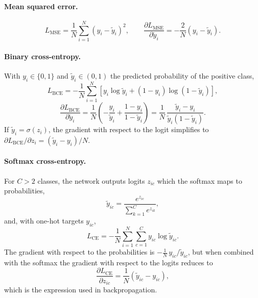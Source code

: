 \documentclass[amssymb,twocolumn,aps]{revtex4}
\begin{document}
\paragraph{Mean squared error.}
\begin{equation}
L_{\mathrm{MSE}} = \frac{1}{N}\sum_{i=1}^{N}\left(y_i-\tilde{y}_i\right)^2,
\qquad
\frac{\partial L_{\mathrm{MSE}}}{\partial \tilde{y}_i} = -\frac{2}{N}\left(y_i-\tilde{y}_i\right).
\end{equation}

\paragraph{Binary cross-entropy.}
With $y_i\in\{0,1\}$ and $\tilde{y}_i\in(0,1)$ the predicted probability of the positive class,
\begin{equation}
L_{\mathrm{BCE}} = -\frac{1}{N}\sum_{i=1}^{N}\left[y_i\log\tilde{y}_i+(1-y_i)\log(1-\tilde{y}_i)\right],
\end{equation}
\begin{equation}
\frac{\partial L_{\mathrm{BCE}}}{\partial \tilde{y}_i}
= \frac{1}{N}\left(-\frac{y_i}{\tilde{y}_i}+\frac{1-y_i}{1-\tilde{y}_i}\right)
= \frac{1}{N}\,\frac{\tilde{y}_i-y_i}{\tilde{y}_i(1-\tilde{y}_i)}.
\end{equation}
If $\tilde{y}_i=\sigma(z_i)$, the gradient with respect to the logit simplifies to $\partial L_{\mathrm{BCE}}/\partial z_i=(\tilde{y}_i-y_i)/N$.

\paragraph{Softmax cross-entropy.}
For $C>2$ classes, the network outputs logits $z_{ic}$ which the softmax maps to probabilities,
\begin{equation}
\tilde{y}_{ic}=\frac{e^{z_{ic}}}{\sum_{k=1}^{C}e^{z_{ik}}},
\end{equation}
and, with one-hot targets $y_{ic}$,
\begin{equation}
L_{\mathrm{CE}} = -\frac{1}{N}\sum_{i=1}^{N}\sum_{c=1}^{C}y_{ic}\log\tilde{y}_{ic}.
\end{equation}
The gradient with respect to the probabilities is $-\frac{1}{N}\,y_{ic}/\tilde{y}_{ic}$, but when combined with the softmax the gradient with respect to the logits reduces to
\begin{equation}
\label{eq:ce_grad}
\frac{\partial L_{\mathrm{CE}}}{\partial z_{ic}}=\frac{1}{N}\left(\tilde{y}_{ic}-y_{ic}\right),
\end{equation}
which is the expression used in backpropagation.
\end{document}
